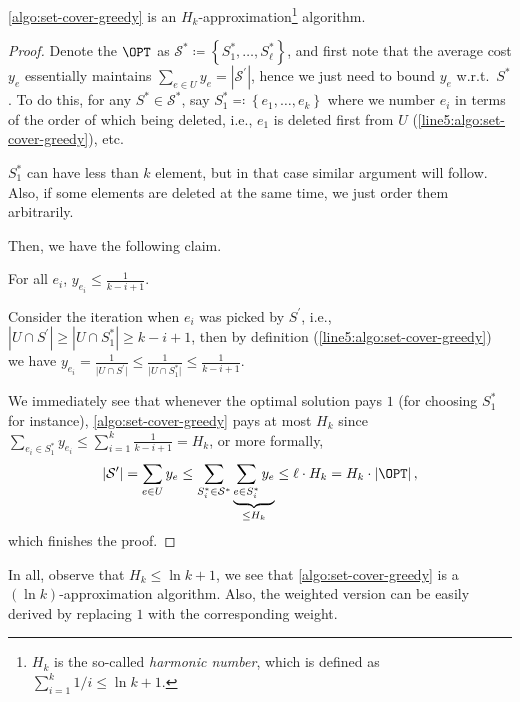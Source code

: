 \begin{theorem}\label{thm:set-cover-k-approx}
	\autoref{algo:set-cover-greedy} is an \(H_k\)-approximation\footnote{\(H_k\) is the so-called \emph{harmonic number}, which is defined as \(\sum_{i=1}^{k} 1 / i \leq \ln k + 1\).} algorithm.
\end{theorem}
\begin{proof}
	Denote the \(\OPT\) as \(\mathcal{S} ^{\ast} \coloneqq \left\{ S_1^{\ast} , \ldots , S_{\ell}^{\ast} \right\}\), and first note that the average cost \(y_e\) essentially maintains \(\sum_{e\in U} y_e = \left\vert \mathcal{S} ^\prime  \right\vert\), hence we just need to bound \(y_e\) w.r.t.\ \(S^{\ast}\). To do this, for any \(S^{\ast} \in \mathcal{S} ^{\ast} \), say \(S_1^{\ast} \eqqcolon \left\{ e_1, \ldots , e_k  \right\} \) where we number \(e_i\) in terms of the order of which being deleted, i.e., \(e_1\) is deleted first from \(U\) (\autoref{line5:algo:set-cover-greedy}), etc.

	\begin{note}
		\(S_1^{\ast} \) can have less than \(k\) element, but in that case similar argument will follow. Also, if some elements are deleted at the same time, we just order them arbitrarily.
	\end{note}

	Then, we have the following claim.

	\begin{claim}\label{clm:set-cover-cost}
		For all \(e_i\), \(y_{e_i} \leq  \frac{1}{k - i + 1}\).
	\end{claim}
	\begin{explanation}
		Consider the iteration when \(e_i\) was picked by \(S^\prime\), i.e., \(\left\vert U \cap S^\prime  \right\vert \geq \left\vert U \cap S_1 ^{\ast} \right\vert \geq k - i + 1\), then by definition (\autoref{line5:algo:set-cover-greedy}) we have \(y_{e_i} = \frac{1}{\vert U \cap S^\prime  \vert } \leq \frac{1}{\vert U \cap  S_1 ^{\ast} \vert} \leq \frac{1}{k - i + 1}\).
	\end{explanation}

	We immediately see that whenever the optimal solution pays \(1\) (for choosing \(S_1^{\ast}\) for instance), \autoref{algo:set-cover-greedy} pays at most \(H_k\) since \(\sum_{e_i\in S_1^{\ast} }y_{e_i} \leq \sum_{i=1}^{k} \frac{1}{k-i+1} = H_k\), or more formally,
	\[
		\left\vert \mathcal{S} ^\prime  \right\vert = \sum_{e\in U}y_e \leq \sum_{S_i^{\ast} \in \mathcal{S} ^{\ast} }\underbrace{\sum_{e\in S_i^{\ast} }y_e}_{\leq H_k} \leq \ell \cdot H_k = H_k\cdot \left\vert \OPT \right\vert,
	\]
	which finishes the proof.
\end{proof}

In all, observe that \(H_k \leq \ln k + 1\), we see that \autoref{algo:set-cover-greedy} is a \((\ln k)\)-approximation algorithm. Also, the weighted version can be easily derived by replacing \(1\) with the corresponding weight.